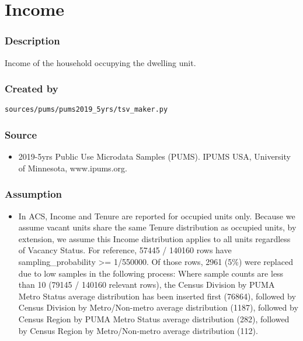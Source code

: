 \section{Income}\label{income}

\subsubsection{Description}\label{description-96}

Income of the household occupying the dwelling unit.

\subsubsection{Created by}\label{created-by-96}

\texttt{sources/pums/pums2019\_5yrs/tsv\_maker.py}

\subsubsection{Source}\label{source-95}

\begin{itemize}
 
\item
  2019-5yrs Public Use Microdata Samples (PUMS). IPUMS USA, University
  of Minnesota, www.ipums.org.
\end{itemize}

\subsubsection{Assumption}\label{assumption-57}

\begin{itemize}
 
\item
  In ACS, Income and Tenure are reported for occupied units only.
  Because we assume vacant units share the same Tenure distribution as
  occupied units, by extension, we assume this Income distribution
  applies to all units regardless of Vacancy Status. For reference,
  57445 / 140160 rows have sampling\_probability \textgreater= 1/550000.
  Of those rows, 2961 (5\%) were replaced due to low samples in the
  following process: Where sample counts are less than 10 (79145 /
  140160 relevant rows), the Census Division by PUMA Metro Status
  average distribution has been inserted first (76864), followed by
  Census Division by
  \textquotesingle Metro\textquotesingle/\textquotesingle Non-metro\textquotesingle{}
  average distribution (1187), followed by Census Region by PUMA Metro
  Status average distribution (282), followed by Census Region by
  \textquotesingle Metro\textquotesingle/\textquotesingle Non-metro\textquotesingle{}
  average distribution (112).
\end{itemize}

